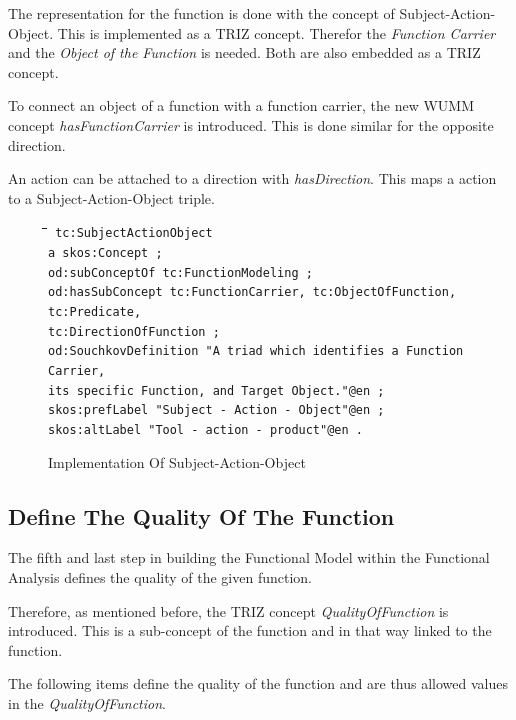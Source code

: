 \documentclass[11pt,a4paper]{article}
\newenvironment{code}{\tt \begin{tabbing}
\hskip12pt\=\hskip12pt\=\hskip12pt\=\hskip12pt\=\hskip5cm\=\hskip5cm\=\kill}
{\end{tabbing}}
\begin{document}
The representation for the function is done with the concept of
Subject-Action-Object.  This is implemented as a TRIZ concept.  Therefor the
\emph{Function Carrier} and the \emph{Object of the Function} is needed.  Both
are also embedded as a TRIZ concept.

To connect an object of a function with a function carrier, the new WUMM
concept \emph{hasFunctionCarrier} is introduced.  This is done similar for the
opposite direction.

An action can be attached to a direction with \emph{hasDirection}.  This maps
a action to a Subject-Action-Object triple.

\begin{figure}[ht]
  \centering
  \begin{code}\tt
    tc:SubjectActionObject\\
    \> a skos:Concept ;\\
    \> od:subConceptOf tc:FunctionModeling ;\\
    \> od:hasSubConcept tc:FunctionCarrier, tc:ObjectOfFunction,
    tc:Predicate,\\ 
    \> \> tc:DirectionOfFunction ;\\
    \> od:SouchkovDefinition "A triad which identifies a Function Carrier,\\ 
    \> \> its specific Function, and Target Object."@en ;\\
    \> skos:prefLabel "Subject - Action - Object"@en ;\\
    \> skos:altLabel "Tool - action - product"@en .
  \end{code}
  \caption{Implementation Of Subject-Action-Object}
  \label{fig:implementation_subject_action_object}
\end{figure}

\subsection{Define The Quality Of The Function}
\label{subsec:quality_function}

The fifth and last step in building the Functional Model within the Functional
Analysis defines the quality of the given function.

Therefore, as mentioned before, the TRIZ concept \emph{QualityOfFunction} is
introduced.  This is a sub-concept of the function and in that way linked to
the function.

The following items define the quality of the function and are thus allowed
values in the \emph{QualityOfFunction}.
\end{document}
